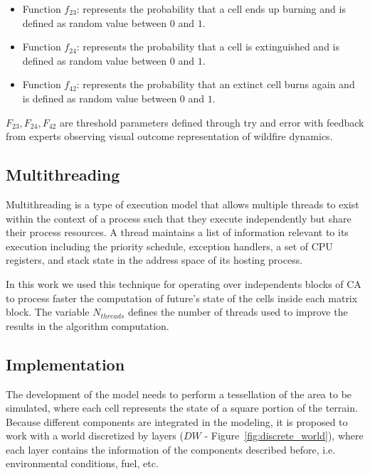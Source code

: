 \documentclass[conference]{IEEEtran}
\begin{document}
\begin{itemize}
          \item Function $f_{23}$: represents the probability that a cell ends up burning and is defined 
            as random value between $0$ and $1$.
          \item Function $f_{24}$: represents the probability that a cell is extinguished and is defined 
            as random value between $0$ and $1$.
          \item Function $f_{42}$: represents the probability that an extinct cell burns again and is 
            defined as random value between $0$ and $1$.
        \end{itemize}
        
        $F_{23}, F_{24}, F_{42}$ are threshold parameters defined through try and error with feedback 
        from experts observing visual outcome representation of wildfire dynamics.
            
    \subsection{Multithreading}
  
      Multithreading is a type of execution model that allows multiple threads to exist within the context of a process 
      such that they execute independently but share their process resources. A thread maintains a list of information 
      relevant to its execution including the priority schedule, exception handlers, a set of CPU registers, and stack 
      state in the address space of its hosting process.
      
      In this work we used this technique for operating over independents blocks of CA to process faster the computation
      of future's state of the cells inside each matrix block. The variable $N_{threads}$ defines the number of threads
      used to improve the results in the algorithm computation.
    

    \subsection{Implementation}
    
      The development of the model needs to perform a tessellation of the area to be simulated, where each 
      cell represents the state of a square portion of the terrain. Because different components are integrated 
      in the modeling, it is proposed to work with a world discretized by layers ($DW$ - 
      Figure~\ref{fig:discrete_world}), where each layer contains the information of the components described 
      before, i.e. environmental conditions, fuel, etc. 
\end{document}
